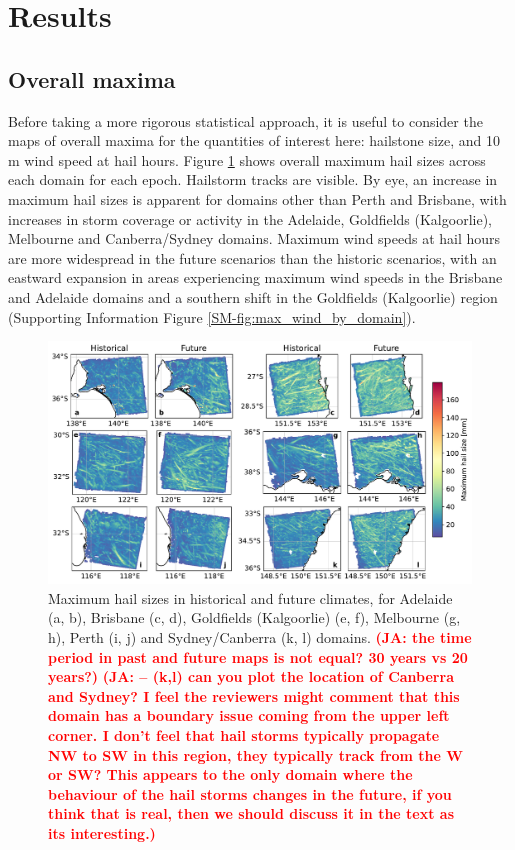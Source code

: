 \documentclass[]{agujournal2019}\usepackage[]{graphicx}\usepackage[]{xcolor}
\newcommand*{\todo}[1]{\textbf{\textcolor{red}{(#1)}}}
\begin{document}
\section{Results}
\label{sec:results}

\subsection{Overall maxima}
\label{sec:overall_maxima}

Before taking a more rigorous statistical approach, it is useful to consider the
maps of overall maxima for the quantities of interest here: hailstone size, and
10 m wind speed at hail hours. Figure \ref{fig:max_hail_sizes_by_domain} shows
overall maximum hail sizes across each domain for each epoch. Hailstorm tracks
are visible. By eye, an increase in maximum hail sizes is apparent for domains
other than Perth and Brisbane, with increases in storm coverage or activity in
the Adelaide, Goldfields (Kalgoorlie), Melbourne and Canberra/Sydney domains.
Maximum wind speeds at hail hours are more widespread in the future scenarios
than the historic scenarios, with an eastward expansion in areas experiencing
maximum wind speeds in the Brisbane and Adelaide domains and a southern shift in
the Goldfields (Kalgoorlie) region (Supporting Information Figure
\ref{SM-fig:max_wind_by_domain}).

\begin{figure}[!h]
      \includegraphics[width=\textwidth]{figures/max_hail_sizes_by_domain}
      \caption{Maximum hail sizes in historical and future climates, for
      Adelaide (a, b), Brisbane (c, d), Goldfields (Kalgoorlie) (e, f),
      Melbourne (g, h), Perth (i, j) and Sydney/Canberra (k, l) domains.
      \todo{JA: the time period in past and future maps is not equal? 30 years
      vs 20 years?} \todo{JA: – (k,l) can you plot the location of Canberra and
      Sydney? I feel the reviewers might comment that this domain has a boundary
      issue coming from the upper left corner. I don’t feel that hail storms
      typically propagate NW to SW in this region, they typically track from the
      W or SW? This appears to the only domain where the behaviour of the hail
      storms changes in the future, if you think that is real, then we should
      discuss it in the text as its interesting.}}
      \label{fig:max_hail_sizes_by_domain}
\end{figure}
\end{document}
